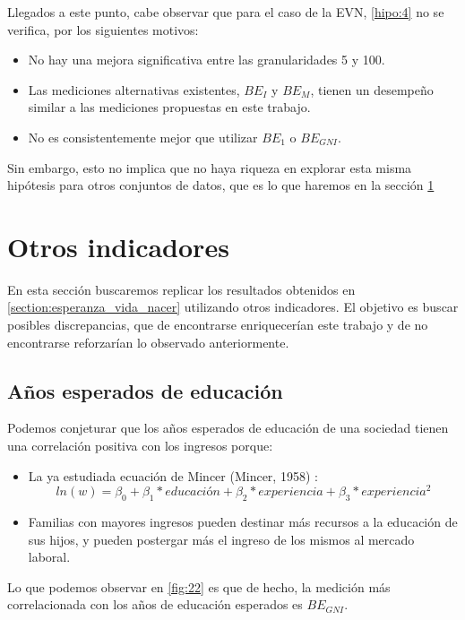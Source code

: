 Llegados a este punto, cabe observar que para el caso de la EVN, \ref{hipo:4} no se verifica, por los siguientes motivos:

\begin{itemize}
    \item No hay una mejora significativa entre las granularidades 5 y 100.
    \item Las mediciones alternativas existentes, $BE_I$ y $BE_M$, tienen un desempeño similar a las mediciones propuestas en este trabajo.
    \item No es consistentemente mejor que utilizar $BE_1$ o $BE_{GNI}$.
\end{itemize}

Sin embargo, esto no implica que no haya riqueza en explorar esta misma hipótesis para otros conjuntos de datos, que es lo que haremos en la sección \ref{section:otros_indicadores}

\section{Otros indicadores}\label{section:otros_indicadores}

En esta sección buscaremos replicar los resultados obtenidos en \ref{section:esperanza_vida_nacer} utilizando otros indicadores. El objetivo es buscar posibles discrepancias, que de encontrarse enriquecerían este trabajo y de no encontrarse reforzarían lo observado anteriormente.

\subsection{Años esperados de educación} 
Podemos conjeturar que los años esperados de educación de una sociedad tienen una correlación positiva con los ingresos porque:

\begin{itemize}
    \item La ya estudiada ecuación de Mincer (Mincer, 1958) \cite{mincer1958investment}: $$ ln(w) = \beta_0 + \beta_1 * educación + \beta_2 * experiencia + \beta_3 * experiencia^2$$
    \item Familias con mayores ingresos pueden destinar más recursos a la educación de sus hijos, y pueden postergar más el ingreso de los mismos al mercado laboral.  
\end{itemize}

Lo que podemos observar en \ref{fig:22} es que de hecho, la medición más correlacionada con los años de educación esperados es $BE_{GNI}$. 


